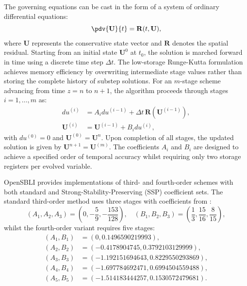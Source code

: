 The governing equations can be cast in the form of a system of ordinary differential equations:
\begin{equation}
    \pdv{\mathbf{U}}{t} = \mathbf{R}(t, \mathbf{U}),
\end{equation}
where $\mathbf{U}$ represents the conservative state vector and $\mathbf{R}$ denotes the spatial residual. Starting from an initial state $\mathbf{U}^0$ at $t_0$, the solution is marched forward in time using a discrete time step $\Delta t$. The \cite{Williamson1980} low-storage Runge-Kutta formulation achieves memory efficiency by overwriting intermediate stage values rather than storing the complete history of substep solutions. For an $m$-stage scheme advancing from time $z=n$ to $n+1$, the algorithm proceeds through stages $i=1,\ldots,m$ as:
\begin{align}
    du^{(i)} &= A_i du^{(i-1)} + \Delta t \, \mathbf{R}\!\left(\mathbf{U}^{(i-1)}\right), \\
    \mathbf{U}^{(i)} &= \mathbf{U}^{(i-1)} + B_i du^{(i)},
\end{align}
with $du^{(0)}=0$ and $\mathbf{U}^{(0)} = \mathbf{U}^n$. Upon completion of all stages, the updated solution is given by $\mathbf{U}^{n+1} = \mathbf{U}^{(m)}$. The coefficients $A_i$ and $B_i$ are designed to achieve a specified order of temporal accuracy whilst requiring only two storage registers per evolved variable.

OpenSBLI provides implementations of third- and fourth-order schemes with both standard and Strong-Stability-Preserving (SSP) coefficient sets. The standard third-order method uses three stages with coefficients from \cite{CarpenterKennedy1994}:
\begin{equation}
    (A_1, A_2, A_3) = \left(0, -\frac{5}{9}, -\frac{153}{128}\right), \quad (B_1, B_2, B_3) = \left(\frac{1}{3}, \frac{15}{16}, \frac{8}{15}\right),
\end{equation}
whilst the fourth-order variant requires five stages:
\begin{equation*}
\begin{aligned}
    (A_1, B_1) &= (0, 0.1496590219993), \\
    (A_2, B_2) &= (-0.4178904745, 0.3792103129999), \\
    (A_3, B_3) &= (-1.192151694643, 0.8229550293869), \\
    (A_4, B_4) &= (-1.697784692471, 0.6994504559488), \\
    (A_5, B_5) &= (-1.514183444257, 0.1530572479681).
\end{aligned}
\end{equation*}

